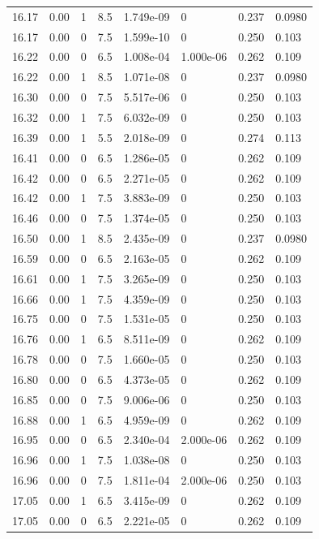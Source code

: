 \documentclass[preview]{standalone}
\begin{document}
{{{{{\begin{tabular}{L{1.2cm}C{1.2cm} C{0.3cm}C{0.5cm} C{1.4cm}C{1.4cm} C{1.4cm}C{1.4cm}}
  16.17  &  0.00  & 1     & 8.5 &  1.749e-09  & 0  & 0.237 &  0.0980   \\ 
  16.17  &  0.00  & 0     & 7.5 &  1.599e-10  & 0  & 0.250 &  0.103   \\ 
  16.22  &  0.00  & 0     & 6.5 &  1.008e-04  & 1.000e-06  & 0.262 &  0.109   \\ 
  16.22  &  0.00  & 1     & 8.5 &  1.071e-08  & 0  & 0.237 &  0.0980   \\ 
  16.30  &  0.00  & 0     & 7.5 &  5.517e-06  & 0  & 0.250 &  0.103   \\ 
  16.32  &  0.00  & 1     & 7.5 &  6.032e-09  & 0  & 0.250 &  0.103   \\ 
  16.39  &  0.00  & 1     & 5.5 &  2.018e-09  & 0  & 0.274 &  0.113   \\ 
  16.41  &  0.00  & 0     & 6.5 &  1.286e-05  & 0  & 0.262 &  0.109   \\ 
  16.42  &  0.00  & 0     & 6.5 &  2.271e-05  & 0  & 0.262 &  0.109   \\ 
  16.42  &  0.00  & 1     & 7.5 &  3.883e-09  & 0  & 0.250 &  0.103   \\ 
  16.46  &  0.00  & 0     & 7.5 &  1.374e-05  & 0  & 0.250 &  0.103   \\ 
  16.50  &  0.00  & 1     & 8.5 &  2.435e-09  & 0  & 0.237 &  0.0980   \\ 
  16.59  &  0.00  & 0     & 6.5 &  2.163e-05  & 0  & 0.262 &  0.109   \\ 
  16.61  &  0.00  & 1     & 7.5 &  3.265e-09  & 0  & 0.250 &  0.103   \\ 
  16.66  &  0.00  & 1     & 7.5 &  4.359e-09  & 0  & 0.250 &  0.103   \\ 
  16.75  &  0.00  & 0     & 7.5 &  1.531e-05  & 0  & 0.250 &  0.103   \\ 
  16.76  &  0.00  & 1     & 6.5 &  8.511e-09  & 0  & 0.262 &  0.109   \\ 
  16.78  &  0.00  & 0     & 7.5 &  1.660e-05  & 0  & 0.250 &  0.103   \\ 
  16.80  &  0.00  & 0     & 6.5 &  4.373e-05  & 0  & 0.262 &  0.109   \\ 
  16.85  &  0.00  & 0     & 7.5 &  9.006e-06  & 0  & 0.250 &  0.103   \\ 
  16.88  &  0.00  & 1     & 6.5 &  4.959e-09  & 0  & 0.262 &  0.109   \\ 
  16.95  &  0.00  & 0     & 6.5 &  2.340e-04  & 2.000e-06  & 0.262 &  0.109   \\ 
  16.96  &  0.00  & 1     & 7.5 &  1.038e-08  & 0  & 0.250 &  0.103   \\ 
  16.96  &  0.00  & 0     & 7.5 &  1.811e-04  & 2.000e-06  & 0.250 &  0.103   \\ 
  17.05  &  0.00  & 1     & 6.5 &  3.415e-09  & 0  & 0.262 &  0.109   \\ 
  17.05  &  0.00  & 0     & 6.5 &  2.221e-05  & 0  & 0.262 &  0.109   \\ 
\hline 
\end{tabular} 

}}}}}
\end{document}
